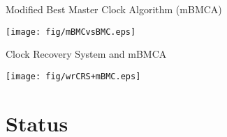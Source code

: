 \documentclass[compress,red]{beamer}
\begin{document}
\begin{frame}{Modified Best Master Clock Algorithm (mBMCA)}

    \begin{center}
    \texttt{[image: fig/mBMCvsBMC.eps]}
    \end{center}


\end{frame}
\begin{frame}{Clock Recovery System and mBMCA}


  \begin{center}
  \texttt{[image: fig/wrCRS+mBMC.eps]}
  \end{center}

\end{frame}
\section{Status}
\end{document}
